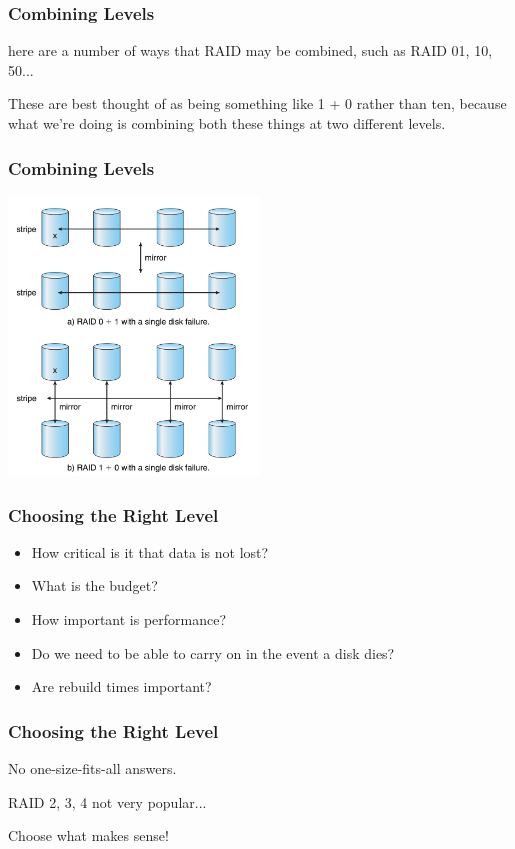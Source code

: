 \begin{frame}
\frametitle{Combining Levels}

here are a number of ways that RAID may be combined, such as RAID 01, 10, 50... 

These are best thought of as being something like 1 + 0 rather than ten, because what we're doing is combining both these things at two different levels. 

\end{frame}

\begin{frame}
\frametitle{Combining Levels}

\begin{center}
	\includegraphics[width=0.5\textwidth]{images/raid10-01.png}
\end{center}


\end{frame}


\begin{frame}
\frametitle{Choosing the Right Level}

\begin{itemize}
	\item How critical is it that data is not lost?
	\item What is the budget?
	\item How important is performance?
	\item Do we need to be able to carry on in the event a disk dies?
	\item Are rebuild times important?
\end{itemize}

\end{frame}


\begin{frame}
\frametitle{Choosing the Right Level}

No one-size-fits-all answers.

RAID 2, 3, 4 not very popular...

Choose what makes sense!

\end{frame}







